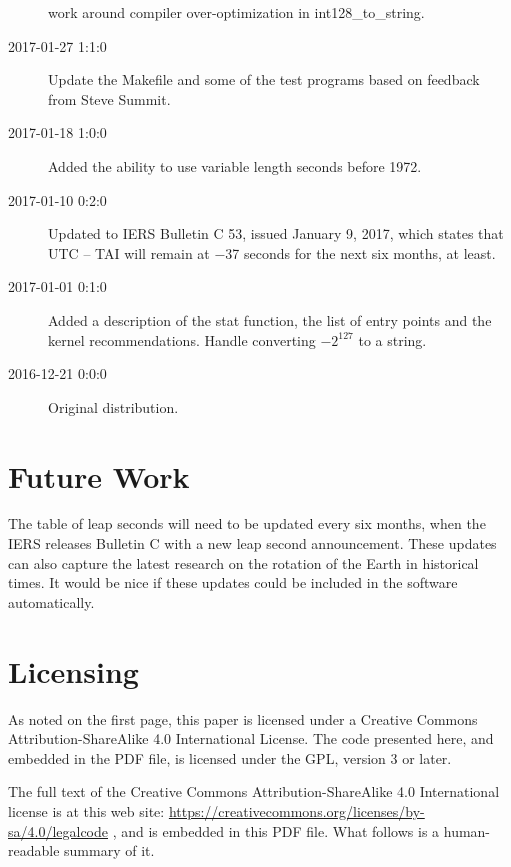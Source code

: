 \documentclass[letterpaper,twoside]{article}
\begin{document}
\begin{description}
  work around compiler over-optimization in int128\_to\_string.
\item[2017-01-27 1:1:0] Update the Makefile and some of the test programs
  based on feedback from Steve Summit.
\item[2017-01-18 1:0:0] Added the ability to use variable length seconds
  before 1972.
\item[2017-01-10 0:2:0] Updated to IERS Bulletin C 53,
  issued January 9, 2017, which states that UTC -- TAI
  will remain at \num{-37} seconds for the next six months, at least.
\item[2017-01-01 0:1:0] Added a description of the stat function,
  the list of entry points and the kernel recommendations.
  Handle converting $-2^{127}$ to a string. 
\item[2016-12-21 0:0:0] Original distribution.
\end{description}

\section{Future Work}
The table of leap seconds will need to be updated every six months,
when the IERS releases Bulletin C with a new leap second announcement.
These updates can also capture the latest research on the rotation
of the Earth in historical times.  It would be nice if these updates
could be included in the software automatically.

\newpage

\section{Licensing}
\label{section:Licensing}
As noted on the first page, this paper is licensed under a Creative
Commons Attribution-ShareAlike 4.0 International License.  The code
presented here, and embedded in the PDF file, is licensed under
the GPL, version 3 or later.

The full text of the Creative Commons Attribution-ShareAlike 4.0
International license is at this web site:
\url{https://creativecommons.org/licenses/by-sa/4.0/legalcode}%
, and is embedded in this
PDF file.  What follows is a human-readable summary of it.
\end{document}
